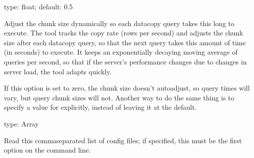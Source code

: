 \documentclass[letterpaper,10pt,english]{sphinxmanual}
\begin{document}
\begin{fulllineitems}
\label{\detokenize{mariadb-schema-change:cmdoption-mariadb-schema-change-chunk-time}}
\sphinxAtStartPar
type: float; default: 0.5

\sphinxAtStartPar
Adjust the chunk size dynamically so each data\sphinxhyphen{}copy query takes this long to
execute.  The tool tracks the copy rate (rows per second) and adjusts the chunk
size after each data\sphinxhyphen{}copy query, so that the next query takes this amount of
time (in seconds) to execute.  It keeps an exponentially decaying moving average
of queries per second, so that if the server’s performance changes due to
changes in server load, the tool adapts quickly.

\sphinxAtStartPar
If this option is set to zero, the chunk size doesn’t auto\sphinxhyphen{}adjust, so query
times will vary, but query chunk sizes will not. Another way to do the same
thing is to specify a value for {\hyperref[\detokenize{mariadb-schema-change:cmdoption-mariadb-schema-change-chunk-size}]{}} explicitly, instead of leaving
it at the default.

\end{fulllineitems}


\begin{fulllineitems}
\label{\detokenize{mariadb-schema-change:cmdoption-mariadb-schema-change-config}}
\sphinxAtStartPar
type: Array

\sphinxAtStartPar
Read this comma\sphinxhyphen{}separated list of config files; if specified, this must be the
first option on the command line.

\end{fulllineitems}
\end{document}
